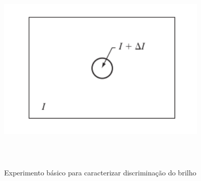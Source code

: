 \documentclass[12pt]{article}
\begin{document}
    \begin{figure}[h]
        \centering
        \includegraphics[width=10cm,height=10cm]{images/9.png}
        \caption{Experimento básico para caracterizar discriminação do brilho}
        \label{fig:Variação do I}
    \end{figure}
\end{document}
